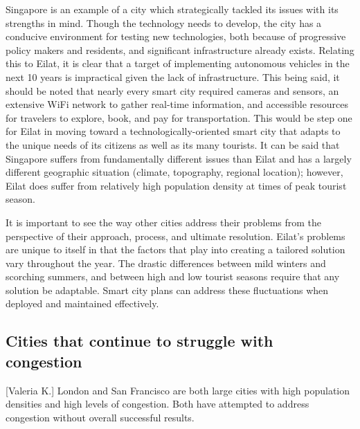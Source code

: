 \documentclass[12pt]{article}                               %
\begin{document}
Singapore is an example of a city which strategically tackled its issues with its strengths in mind. Though the technology needs to develop, the city has a conducive environment for testing new technologies, both because of progressive policy makers and residents, and significant infrastructure already exists. Relating this to Eilat, it is clear that a target of implementing autonomous vehicles in the next 10 years is impractical given the lack of infrastructure. This being said, it should be noted that nearly every smart city required cameras and sensors, an extensive WiFi network to gather real-time information, and accessible resources for travelers to explore, book, and pay for transportation. This would be step one for Eilat in moving toward a technologically-oriented smart city that adapts to the unique needs of its citizens as well as its many tourists. It can be said that Singapore suffers from fundamentally different issues than Eilat and has a largely different geographic situation (climate, topography, regional location); however, Eilat does suffer from relatively high population density at times of peak tourist season. 

It is important to see the way other cities address their problems from the perspective of their approach, process, and ultimate resolution. Eilat's problems are unique to itself in that the factors that play into creating a tailored solution vary throughout the year. The drastic differences between mild winters and scorching summers, and between high and low tourist seasons require that any solution be adaptable. Smart city plans can address these fluctuations when deployed and maintained effectively.

\subsection{Cities that continue to struggle with congestion}[Valeria K.]
London and San Francisco are both large cities with high population densities and high levels of congestion. Both have attempted to address congestion without overall successful results. 
\end{document}
